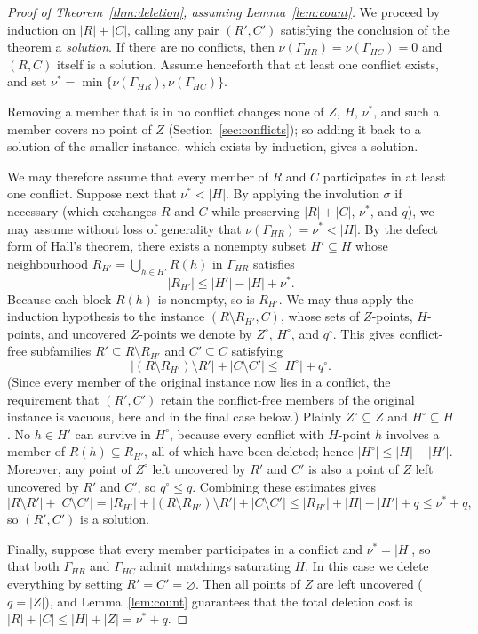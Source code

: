 \documentclass[11pt]{amsart}
\theoremstyle{remark}
\newcommand{\abs}[1]{\lvert #1\rvert}
\begin{document}
\begin{proof}[Proof of Theorem~\ref{thm:deletion}, assuming Lemma~\ref{lem:count}]
We proceed by induction on $\abs R+\abs C$, calling any pair $(R',C')$ satisfying the conclusion of the theorem a \emph{solution}. If there are no conflicts, then $\nu(\Gamma_{HR})=\nu(\Gamma_{HC})=0$ and $(R,C)$ itself is a solution. Assume henceforth that at least one conflict exists, and set $\nu^\ast=\min\{\nu(\Gamma_{HR}),\nu(\Gamma_{HC})\}$.

Removing a member that is in no conflict changes none of $Z$, $H$, $\nu^\ast$, and such a member covers no point of $Z$ (Section~\ref{sec:conflicts}); so adding it back to a solution of the smaller instance, which exists by induction, gives a solution.

We may therefore assume that every member of $R$ and $C$ participates in at least one conflict. Suppose next that $\nu^\ast<\abs H$. By applying the involution $\sigma$ if necessary (which exchanges $R$ and $C$ while preserving $\abs R+\abs C$, $\nu^\ast$, and $q$), we may assume without loss of generality that $\nu(\Gamma_{HR})=\nu^\ast<\abs H$. By the defect form of Hall's theorem, there exists a nonempty subset $H'\subseteq H$ whose neighbourhood $R_{H'}=\bigcup_{h\in H'}R(h)$ in $\Gamma_{HR}$ satisfies
\[
  \abs{R_{H'}}\le\abs{H'}-\abs H+\nu^\ast.
\]
Because each block $R(h)$ is nonempty, so is $R_{H'}$. We may thus apply the induction hypothesis to the instance $(R\setminus R_{H'},C)$, whose sets of $Z$-points, $H$-points, and uncovered $Z$-points we denote by $Z^\circ$, $H^\circ$, and $q^\circ$. This gives conflict-free subfamilies $R'\subseteq R\setminus R_{H'}$ and $C'\subseteq C$ satisfying
\[
  \abs{(R\setminus R_{H'})\setminus R'}+\abs{C\setminus C'}
  \le\abs{H^\circ}+q^\circ.
\]
(Since every member of the original instance now lies in a conflict, the requirement that $(R',C')$ retain the conflict-free members of the original instance is vacuous, here and in the final case below.)
Plainly $Z^\circ\subseteq Z$ and $H^\circ\subseteq H$. No $h\in H'$ can survive in $H^\circ$, because every conflict with $H$-point $h$ involves a member of $R(h)\subseteq R_{H'}$, all of which have been deleted; hence $\abs{H^\circ}\le\abs H-\abs{H'}$. Moreover, any point of $Z^\circ$ left uncovered by $R'$ and $C'$ is also a point of $Z$ left uncovered by $R'$ and $C'$, so $q^\circ\le q$. Combining these estimates gives
\[
  \abs{R\setminus R'}+\abs{C\setminus C'}
  =\abs{R_{H'}}+\abs{(R\setminus R_{H'})\setminus R'}+\abs{C\setminus C'}
  \le\abs{R_{H'}}+\abs H-\abs{H'}+q\le\nu^\ast+q,
\]
so $(R',C')$ is a solution.

Finally, suppose that every member participates in a conflict and $\nu^\ast=\abs H$, so that both $\Gamma_{HR}$ and $\Gamma_{HC}$ admit matchings saturating $H$. In this case we delete everything by setting $R'=C'=\varnothing$. Then all points of $Z$ are left uncovered ($q=\abs Z$), and Lemma~\ref{lem:count} guarantees that the total deletion cost is $\abs R+\abs C\le\abs H+\abs Z=\nu^\ast+q$.
\end{proof}
\end{document}
